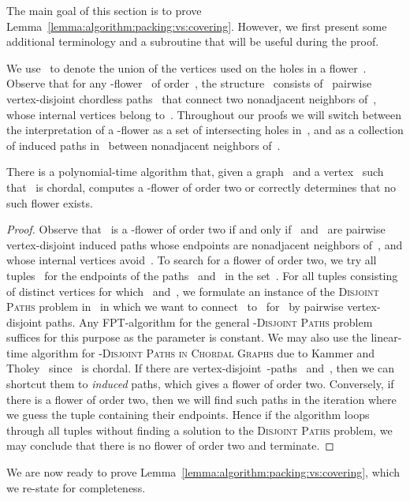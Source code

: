 The main goal of this section is to prove Lemma~\ref{lemma:algorithm:packing:vs:covering}. However, we first present some additional terminology and a subroutine that will be useful during the proof.

We use~ to denote the union of the vertices used on the holes in a flower~. Observe that for any -flower~ of order~, the structure~ consists of~ pairwise vertex-disjoint chordless paths~ that connect two nonadjacent neighbors of~, whose internal vertices belong to~. Throughout our proofs we will switch between the interpretation of a -flower as a set of intersecting holes in~, and as a collection of induced paths in~ between nonadjacent neighbors of~.

\begin{proposition} \label{proposition:twoflower}
There is a polynomial-time algorithm that, given a graph~ and a vertex~ such that~ is chordal, computes a -flower of order two or correctly determines that no such flower exists.
\end{proposition}
\begin{proof}
Observe that~ is a -flower of order two if and only if~ and~ are pairwise vertex-disjoint induced paths whose endpoints are nonadjacent neighbors of~, and whose internal vertices avoid~. To search for a flower of order two, we try all~ tuples~ for the endpoints of the paths~ and~ in the set~. For all tuples consisting of distinct vertices for which~ and~, we formulate an instance of the \textsc{Disjoint Paths} problem in~ in which we want to connect~ to~ for~ by pairwise vertex-disjoint paths. Any FPT-algorithm for the general \textsc{-Disjoint Paths} problem suffices for this purpose as the parameter is constant. We may also use the linear-time algorithm for \textsc{-Disjoint Paths in Chordal Graphs} due to Kammer and Tholey~\cite{KammerT09} since~ is chordal. If there are vertex-disjoint~-paths~ and~, then we can shortcut them to \emph{induced} paths, which gives a flower of order two. Conversely, if there is a flower of order two, then we will find such paths in the iteration where we guess the tuple containing their endpoints. Hence if the algorithm loops through all tuples without finding a solution to the \textsc{Disjoint Paths} problem, we may conclude that there is no flower of order two and terminate.
\end{proof}

We are now ready to prove Lemma~\ref{lemma:algorithm:packing:vs:covering}, which we re-state for completeness.

